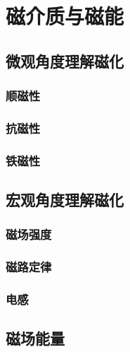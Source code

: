 

\section{磁介质与磁能}\label{18-4}

\subsection{微观角度理解磁化}\label{18-4-1}

\subsubsection{顺磁性}\label{18-4-1-1}

\subsubsection{抗磁性}\label{18-4-1-2}

\subsubsection{铁磁性}\label{18-4-1-3}

\subsection{宏观角度理解磁化}\label{18-4-2}

\subsubsection{磁场强度}\label{18-4-2-1}

\subsubsection{磁路定律}\label{18-4-2-2}

\subsubsection{电感}\label{18-4-2-3}

\subsection{磁场能量}\label{18-4-3}
